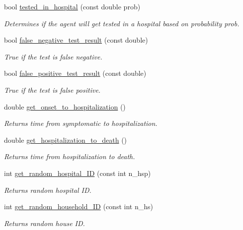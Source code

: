 \begin{DoxyCompactItemize}
bool \hyperlink{classInfection_a138e3f760822833a0358537e86ea5836}{tested\+\_\+in\+\_\+hospital} (const double prob)
\begin{DoxyCompactList}\small\item\em Determines if the agent will get tested in a hospital based on probability prob. \end{DoxyCompactList}\item 
bool \hyperlink{classInfection_adedba0ccbb05007fb07d4a7f08a3c538}{false\+\_\+negative\+\_\+test\+\_\+result} (const double)
\begin{DoxyCompactList}\small\item\em True if the test is false negative. \end{DoxyCompactList}\item 
bool \hyperlink{classInfection_af19ee6eae6168a5028dd4c261a6e109a}{false\+\_\+positive\+\_\+test\+\_\+result} (const double)
\begin{DoxyCompactList}\small\item\em True if the test is false positive. \end{DoxyCompactList}\item 
double \hyperlink{classInfection_a46986a1c5d2f73142033a18b3821f9c9}{get\+\_\+onset\+\_\+to\+\_\+hospitalization} ()
\begin{DoxyCompactList}\small\item\em Returns time from symptomatic to hospitalization. \end{DoxyCompactList}\item 
double \hyperlink{classInfection_ab0b519435d45c41e37b39dd45f87078d}{get\+\_\+hospitalization\+\_\+to\+\_\+death} ()
\begin{DoxyCompactList}\small\item\em Returns time from hospitalization to death. \end{DoxyCompactList}\item 
int \hyperlink{classInfection_ac6ccfd575ad5f6db803edfd7431aab25}{get\+\_\+random\+\_\+hospital\+\_\+\+ID} (const int n\+\_\+hsp)
\begin{DoxyCompactList}\small\item\em Returns random hospital ID. \end{DoxyCompactList}\item 
int \hyperlink{classInfection_a4108bce6ea152f84adc3495188ce55a8}{get\+\_\+random\+\_\+household\+\_\+\+ID} (const int n\+\_\+hs)
\begin{DoxyCompactList}\small\item\em Returns random house ID. \end{DoxyCompactList}\item 

\end{DoxyCompactItemize}
